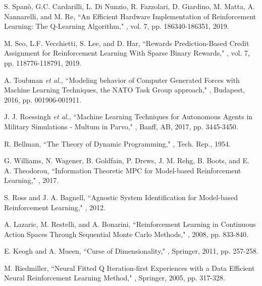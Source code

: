\documentclass{ieeeaccess}
\begin{document}

\begin{thebibliography}{46}
S. Spanò, G.C. Cardarilli, L. Di Nunzio, R.  Fazzolari, D. Giardino, M. Matta, A. Nannarelli, and M. Re,
\newblock ``An Efficient Hardware Implementation of Reinforcement Learning: The Q-Learning Algorithm,"
, vol. 7, pp. 186340-186351, 2019.

M. Seo, L.F.  Vecchietti, S. Lee, and D. Har,
\newblock ``Rewards Prediction-Based Credit Assignment for Reinforcement Learning With Sparse Binary Rewards,"
, vol. 7, pp. 118776-118791, 2019.

A. Toubman \textit{et al.},
\newblock ``Modeling behavior of Computer Generated Forces with Machine Learning Techniques, the NATO Task Group approach,"
, Budapest, 2016, pp. 001906-001911.

J. J. Roessingh \textit{et al.},
\newblock ``Machine Learning Techniques for Autonomous Agents in Military Simulations - Multum in Parvo,"
, Banff, AB, 2017, pp. 3445-3450.

R. Bellman,
\newblock ``The Theory of Dynamic Programming,"
, Tech. Rep., 1954.

G. Williams, N. Wagener, B. Goldfain, P. Drews, J. M. Rehg, B. Boots, and E. A. Theodorou,
\newblock ``Information Theoretic MPC for Model-based Reinforcement Learning,"
, 2017.

S. Ross and J. A. Bagnell,
\newblock ``Agnostic System Identification for Model-based Reinforcement Learning,"
, 2012.

 A. Lazaric, M. Restelli, and A. Bonarini,
``Reinforcement Learning in Continuous Action Spaces Through Sequential Monte Carlo Methods,"
, 2008, pp. 833-840.

 E. Keogh and A. Mueen,
\newblock``Curse of Dimensionality,"
, Springer, 2011, pp. 257-258.

 M. Riedmiller,
\newblock ``Neural Fitted Q Iteration-first Experiences with a Data Efficient Neural Reinforcement Learning Method,"
, Springer, 2005, pp. 317-328.


\end{thebibliography}
\end{document}
